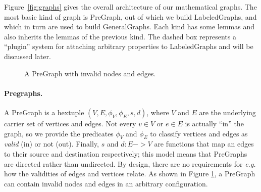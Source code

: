 Figure~\ref{fig:graphs} gives the overall architecture of our mathematical graphs.
The most basic kind of graph is PreGraph, out of which we build LabeledGraphs, and which in turn are used
to build GeneralGraphs.  Each kind has some lemmas and also inherits the lemmas of the previous kind.  The dashed box represents a ``plugin'' system for attaching arbitrary properties to LabeledGraphs and will be discussed later. %

\begin{figure}[t]
\centering
{}
\endpgfgraphicnamed
\vspace{1ex}
\caption{A PreGraph with invalid nodes and edges.}\label{fig:pregraph}
\end{figure}

\iftrue
\paragraph{Pregraphs.} A PreGraph is a hextuple $(V, E, \phi_V, \phi_E, s, d)$,
where $V$ and $E$ are the underlying carrier set of vertices and edges.  Not every $v \in V$ or $e \in E$ is actually ``in'' the graph, so we provide the predicates $\phi_V$ and $\phi_E$ to classify vertices and edges as \emph{valid} (in) or not (out).  Finally, $s$ and $d : E -> V$ are functions that map an edges to their source and destination respectively; this model means that PreGraphs are directed rather than undirected.  By design, there are no requirements for \emph{e.g.} how the validities of edges and vertices relate.  As shown in Figure \ref{fig:pregraph}, a PreGraph can contain invalid nodes and edges in an arbitrary configuration.

